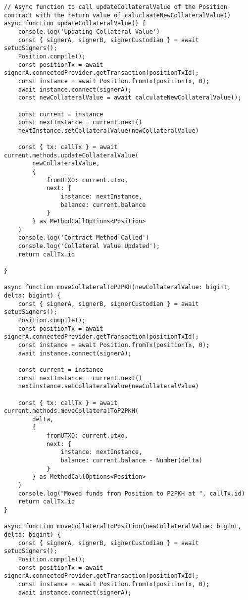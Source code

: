 \begin{lstlisting}[style=htmlcssjs, caption=Moving funds beteween Collateral Position and Parties' Balances based on updated collateral valuation]
// Async function to call updateCollateralValue of the Position contract with the return value of caluclaateNewCollateralValue()
async function updateCollateralValue() {
    console.log('Updating Collateral Value')
    const { signerA, signerB, signerCustodian } = await setupSigners();
    Position.compile();
    const positionTx = await signerA.connectedProvider.getTransaction(positionTxId);
    const instance = await Position.fromTx(positionTx, 0);
    await instance.connect(signerA);
    const newCollateralValue = await calculateNewCollateralValue();

    const current = instance
    const nextInstance = current.next()
    nextInstance.setCollateralValue(newCollateralValue)

    const { tx: callTx } = await current.methods.updateCollateralValue(
        newCollateralValue,
        {
            fromUTXO: current.utxo,
            next: {
                instance: nextInstance,
                balance: current.balance
            } 
        } as MethodCallOptions<Position>
    )
    console.log('Contract Method Called')
    console.log('Collateral Value Updated');
    return callTx.id
    
}

async function moveCollateralToP2PKH(newCollateralValue: bigint, delta: bigint) {
    const { signerA, signerB, signerCustodian } = await setupSigners();
    Position.compile();
    const positionTx = await signerA.connectedProvider.getTransaction(positionTxId);
    const instance = await Position.fromTx(positionTx, 0);
    await instance.connect(signerA);

    const current = instance
    const nextInstance = current.next()
    nextInstance.setCollateralValue(newCollateralValue)

    const { tx: callTx } = await current.methods.moveCollateralToP2PKH(
        delta,
        {
            fromUTXO: current.utxo,
            next: {
                instance: nextInstance,
                balance: current.balance - Number(delta)
            } 
        } as MethodCallOptions<Position>
    )
    console.log("Moved funds from Position to P2PKH at ", callTx.id)
    return callTx.id
}

async function moveCollateralToPosition(newCollateralValue: bigint, delta: bigint) {
    const { signerA, signerB, signerCustodian } = await setupSigners();
    Position.compile();
    const positionTx = await signerA.connectedProvider.getTransaction(positionTxId);
    const instance = await Position.fromTx(positionTx, 0);
    await instance.connect(signerA);


\end{lstlisting}
